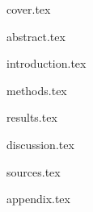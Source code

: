 \documentclass{article}
\begin{document}
{cover.tex}

\tableofcontents
\newpage

{abstract.tex}

{introduction.tex}

{methods.tex}

{results.tex}

{discussion.tex}

{sources.tex}

{appendix.tex}
\end{document}
